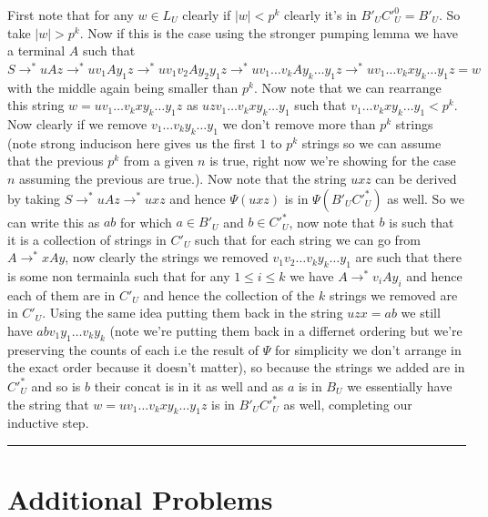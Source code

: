 \documentclass[11pt]{article}
\newenvironment{proof}{{\bf Proof:}}{\hfill\rule{2mm}{2mm}}
\begin{document}
\begin{proof}
  First note that for any $w \in L_U$  clearly if $|w|  < p^{k}$ clearly it's in $B'_UC'_U^{0} = B'_U$. So take $|w| > p^{k}$. Now if this is the case using the stronger pumping lemma we have a terminal $A$ such that $S \to^{*} uAz \to^{*} uv_{1}Ay_{1}z \to^{*} uv_{1}v_{2} Ay_{2}y_{1} z \to^{*} uv_{1} \dots v_kA y_k \dots y_{1}z \to^{*} u v_{1} \dots v_k x y_k \dots y_{1} z = w$ with the middle again being smaller than $p^{k}$. Now note that we can rearrange this string $w =u v_{1} \dots v_k x y_k \dots y_{1} z $ as $uz  v_{1} \dots v_k x y_k \dots y_{1}$ such that $ v_{1} \dots v_k x y_k \dots y_{1} < p^{k}$. Now clearly if we remove $v_{1} \dots v_k y_k \dots y_{1}$ we don't remove more than $p^{k}$ strings (note strong inducison here gives us the first $1$ to $p^{k}$ strings so we can assume that the previous $p^{k}$ from a given $n$ is true, right now we're showing for the case $n$ assuming the previous are true.). Now note that the string $uxz$ can be derived by taking $S \to^{*} uAz \to^{*} u x z$ and hence $\Psi(uxz)$ is in $\Psi(B'_UC'_U^{*})$ as well. So we can write this as $a b$ for which $a \in B'_U$ and $b \in C'_U^{*}$, now note that $b$ is such that it is a collection of strings in $C'_U$ such that for each string we can go from $A \to^{*} xAy$, now clearly the strings we removed $v_{1} v_{2} \dots v_k y_k \dots y_{1}$ are such that there is some non termainla such that for any $1 \le i \le k$ we have $A \to^{*}v_{i} A y_i$ and hence each of them are in $C'_U$ and hence the collection of the $k$ strings we removed are in $C'_U$. Using the same idea putting them back in the string $uz x = ab$ we still have $ab v_{1}y_{1} \dots v_k y_k$ (note we're putting them back in a differnet ordering but we're preserving the counts of each i.e the result of $\Psi$ for simplicity we don't arrange in the exact order because it doesn't matter), so because the strings we added are in $C'_U^*$ and so is $b$ their concat is in it as well and as $a$ is in $B_U$ we essentially have the string that $w =u v_{1} \dots v_k x y_k \dots y_{1} z $ is in $B'_UC'_U^{*}$ as well, completing our inductive step.
\end{proof}

\newpage
\section{Additional Problems}
\end{document}
